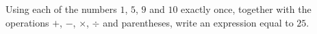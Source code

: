 Using each of the numbers $1$, $5$, $9$ and $10$ exactly once, together with the operations $+$, $-$, $\times$, $\div$ and parentheses, write an expression equal to $25$.
